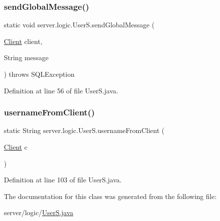 \subsubsection{\texorpdfstring{send\+Global\+Message()}{sendGlobalMessage()}}
{\footnotesize\ttfamily static void server.\+logic.\+User\+S.\+send\+Global\+Message (\begin{DoxyParamCaption}\item[{\hyperlink{classserver_1_1conn_1_1_client}{Client}}]{client,  }\item[{String}]{message }\end{DoxyParamCaption}) throws S\+Q\+L\+Exception\hspace{0.3cm}{\ttfamily [static]}}



Definition at line 56 of file User\+S.\+java.

\hypertarget{classserver_1_1logic_1_1_user_s_a06699931e2b2dde64d63f2f56b3e8524}{}\label{classserver_1_1logic_1_1_user_s_a06699931e2b2dde64d63f2f56b3e8524} 
\subsubsection{\texorpdfstring{username\+From\+Client()}{usernameFromClient()}}
{\footnotesize\ttfamily static String server.\+logic.\+User\+S.\+username\+From\+Client (\begin{DoxyParamCaption}\item[{\hyperlink{classserver_1_1conn_1_1_client}{Client}}]{c }\end{DoxyParamCaption})\hspace{0.3cm}{\ttfamily [static]}}



Definition at line 103 of file User\+S.\+java.



The documentation for this class was generated from the following file\+:\begin{DoxyCompactItemize}
\item 
server/logic/\hyperlink{_user_s_8java}{User\+S.\+java}\end{DoxyCompactItemize}
